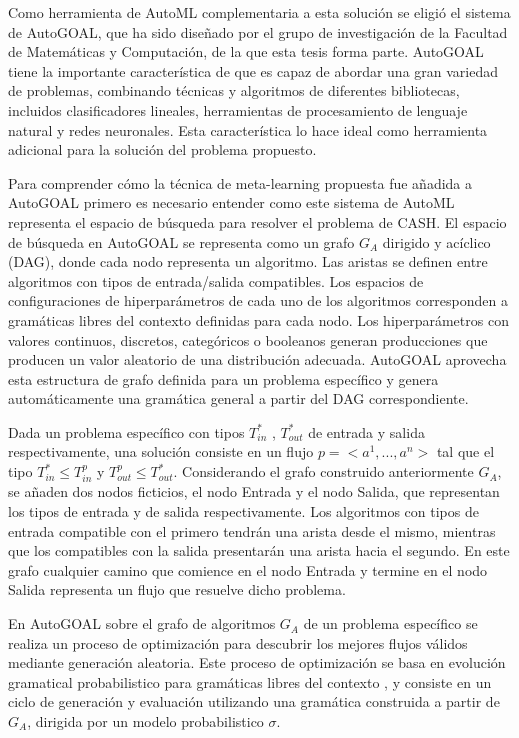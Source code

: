 Como herramienta de AutoML complementaria a esta solución se eligió el sistema de AutoGOAL, que ha sido diseñado por el grupo de investigación de la Facultad de Matemáticas y Computación, de la que esta tesis forma parte. AutoGOAL tiene la importante característica de que es capaz de abordar una gran variedad de problemas, combinando técnicas y algoritmos de diferentes bibliotecas, incluidos clasificadores lineales, herramientas de procesamiento de lenguaje natural y redes neuronales. Esta característica lo hace ideal como herramienta adicional para la solución del problema propuesto.

Para comprender cómo la técnica de meta-learning propuesta fue añadida a AutoGOAL primero es necesario entender como este sistema de AutoML representa el espacio de búsqueda para resolver el problema de CASH. El espacio de búsqueda en AutoGOAL se representa como un grafo $G_A$ dirigido y acíclico (DAG), donde cada nodo representa un algoritmo. Las aristas se definen entre algoritmos con tipos de entrada/salida compatibles. Los espacios de configuraciones de hiperparámetros de cada uno de los algoritmos corresponden a gramáticas libres del contexto definidas para cada nodo. Los hiperparámetros con valores continuos, discretos, categóricos o booleanos generan producciones que producen un valor aleatorio de una distribución adecuada. AutoGOAL aprovecha esta estructura de grafo definida para un problema específico y genera automáticamente una gramática general a partir del DAG correspondiente.

Dada un problema específico con tipos $T^*_{in}$ , $T^*_{out}$ de entrada y salida respectivamente, una solución consiste en un flujo $p =<a^1, ..., a^n >$ tal que el tipo $T^*_{in} \leq T^p_{in}$ y $T^p_{out} \leq T^*_{out}$. Considerando el grafo construido anteriormente $G_A$, se añaden dos nodos ficticios, el nodo Entrada y el nodo Salida, que representan los tipos de entrada y de salida respectivamente. Los algoritmos con tipos de entrada compatible con el primero tendrán una arista desde el mismo, mientras que los compatibles con la salida presentarán una arista hacia el segundo. En este grafo cualquier camino que comience en el nodo Entrada y termine en el nodo Salida representa un flujo que resuelve dicho problema. 

En AutoGOAL sobre el grafo de algoritmos $G_A$ de un problema específico se realiza un proceso de optimización para descubrir los mejores flujos válidos mediante generación aleatoria. Este proceso de optimización se basa en evolución gramatical probabilistico para gramáticas libres del contexto \cite{pge2015}, y consiste en un ciclo de generación y evaluación utilizando una gramática construida a partir de $G_A$, dirigida por un modelo probabilistico $\sigma$.

